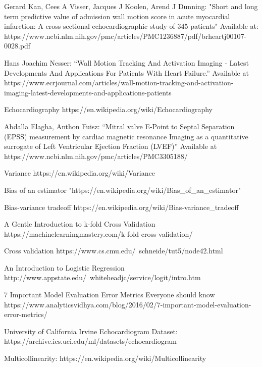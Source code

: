 \documentclass[11pt]{article}
\begin{document}
\newpage
\begin{thebibliography}{5}

Gerard Kan, Cees A Visser, Jacques J Koolen, Arend J Dunning: "Short and long term predictive value of admission wall motion score in acute myocardial infarction: A cross sectional echocardiographic study of 345 patients" Available at: https://www.ncbi.nlm.nih.gov/pmc/articles/PMC1236887/pdf/brheartj00107-0028.pdf

Hans Joachim Nesser: “Wall Motion Tracking And Activation Imaging - Latest Developments And Applications For Patients With Heart Failure.” Available at https://www.ecrjournal.com/articles/wall-motion-tracking-and-activation-imaging-latest-developments-and-applications-patients

Echocardiography https://en.wikipedia.org/wiki/Echocardiography 

Abdalla Elagha, Anthon Fuisz: “Mitral valve E-Point to Septal Separation (EPSS) measurement by cardiac magnetic resonance Imaging as a quantitative surrogate of Left Ventricular Ejection Fraction (LVEF)” Available at  https://www.ncbi.nlm.nih.gov/pmc/articles/PMC3305188/ 

Variance https://en.wikipedia.org/wiki/Variance

Bias of an estimator "https://en.wikipedia.org/wiki/Bias\_of\_an\_estimator"

Bias-variance tradeoff https://en.wikipedia.org/wiki/Bias-variance\_tradeoff

A Gentle Introduction to k-fold Cross Validation https://machinelearningmastery.com/k-fold-cross-validation/

Cross validation https://www.cs.cmu.edu/~schneide/tut5/node42.html 

An Introduction to Logistic Regression http://www.appstate.edu/~whiteheadjc/service/logit/intro.htm 

7 Important Model Evaluation Error Metrics Everyone should know https://www.analyticsvidhya.com/blog/2016/02/7-important-model-evaluation-error-metrics/

University of California Irvine Echocardiogram Dataset: https://archive.ics.uci.edu/ml/datasets/echocardiogram

Multicollinearity: https://en.wikipedia.org/wiki/Multicollinearity

\end{thebibliography}
\end{document}
